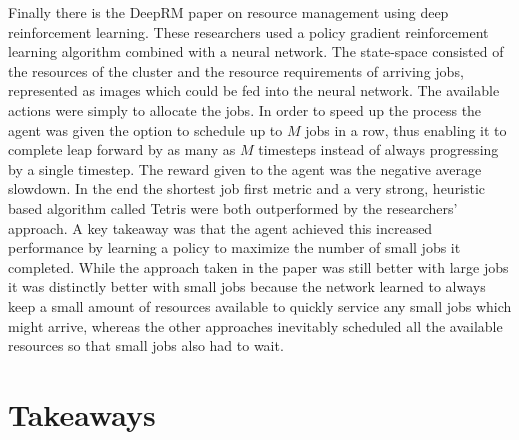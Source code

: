Finally there is the DeepRM paper on resource management using deep reinforcement learning. These researchers used a policy gradient reinforcement learning algorithm combined with a neural network. The state-space consisted of the resources of the cluster and the resource requirements of arriving jobs, represented as images which could be fed into the neural network. The available actions were simply to allocate the jobs. In order to speed up the process the agent was given the option to schedule up to $M$ jobs in a row, thus enabling it to complete leap forward by as many as $M$ timesteps instead of always progressing by a single timestep. The reward given to the agent was the negative average slowdown. In the end the shortest job first metric and a very strong, heuristic based algorithm called Tetris were both outperformed by the researchers' approach. A key takeaway was that the agent achieved this increased performance by learning a policy to maximize the number of small jobs it completed. While the approach taken in the paper was still better with large jobs it was distinctly better with small jobs because the network learned to always keep a small amount of resources available to quickly service any small jobs which might arrive, whereas the other approaches inevitably scheduled all the available resources so that small jobs also had to wait.

\section{Takeaways}


